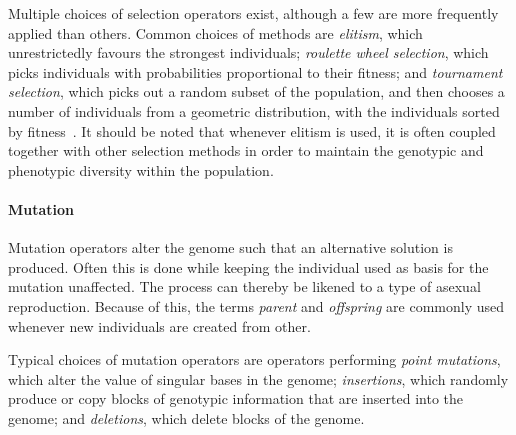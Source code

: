 \documentclass[a4paper,12pt]{article}
\theoremstyle{plain}
\theoremstyle{definition}
\begin{document}
            Multiple choices of selection operators exist, although a few are
            more frequently applied than others. Common choices of methods are 
            \textit{elitism}, which 
            unrestrictedly favours the strongest
            individuals; 
            \textit{roulette wheel selection}, which picks individuals with
            probabilities proportional to their fitness; and 
            \textit{tournament selection}, which picks out a random subset of the population, 
            and then chooses a number of individuals from a geometric
            distribution, with the individuals sorted by
            fitness~\cite{theory_of_ga}.
            It should be noted that whenever elitism is used, it is
            often coupled together with other
            selection methods in order to maintain the genotypic and phenotypic diversity within the
            population.

         \paragraph{Mutation}
            Mutation operators alter the genome 
            such that an alternative solution is produced. Often this is done
            while keeping the individual used as basis for the mutation unaffected.
            The process can thereby be likened to a type of asexual
            reproduction. Because of this, the terms \textit{parent} and
            \textit{offspring} are commonly used whenever new individuals are
            created from other.  
            
            Typical choices of mutation operators are operators performing 
            \textit{point mutations}, which alter the value of singular bases in
            the genome;
            \textit{insertions}, which randomly produce or copy blocks
            of genotypic information that are inserted into the genome; and 
            \textit{deletions}, which delete blocks of the genome.
\end{document}
